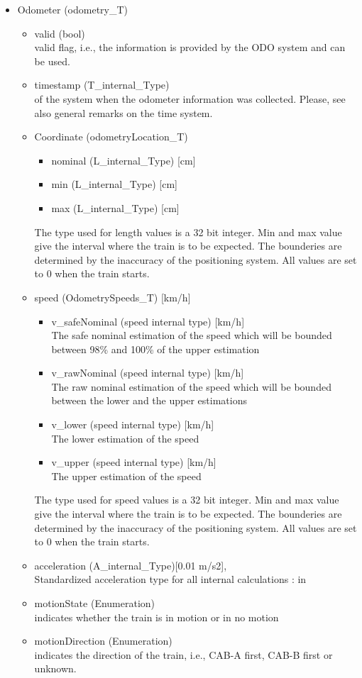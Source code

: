 \begin{itemize}
\item Odometer (odometry\_T)
\begin{itemize}
\item valid (bool)\\
valid flag, i.e., the information is provided by the ODO system and can be used.
\item timestamp (T\_internal\_Type)\\
of the system when the odometer information was collected. Please, see also general remarks on the time system. 
\item Coordinate (odometryLocation\_T)
\begin{itemize}
\item nominal (L\_internal\_Type) [cm]
\item min (L\_internal\_Type) [cm]
\item max (L\_internal\_Type) [cm]
\end{itemize}
The type used for length values is a 32 bit integer. 
Min and max value give the interval where the train is to be expected. The bounderies are determined by the inaccuracy of the positioning system. All values are set to 0 when the train starts.

\item speed (OdometrySpeeds\_T) [km/h]
\begin{itemize}
\item v\_safeNominal (speed internal type) [km/h]\\
The safe nominal estimation of the speed which will
be bounded between 98\% and 100\% of the upper
estimation
\item v\_rawNominal (speed internal type) [km/h]\\
The raw nominal estimation of the speed which will
be bounded between the lower and the upper
estimations
\item v\_lower (speed internal type) [km/h]\\
The lower estimation of the speed
\item v\_upper (speed internal type) [km/h]\\
The upper estimation of the speed
\end{itemize}
The type used for speed values is a 32 bit integer. 
Min and max value give the interval where the train is to be expected. The bounderies are determined by the inaccuracy of the positioning system. All values are set to 0 when the train starts.
\item acceleration (A\_internal\_Type)[0.01 m/s2],\\
Standardized acceleration type for all internal calculations : in 
\item motionState (Enumeration)\\
indicates whether the train is in motion or in no motion
\item motionDirection (Enumeration)\\
indicates the direction of the train, i.e., CAB-A first, CAB-B first or unknown.
\end{itemize}
\end{itemize}

